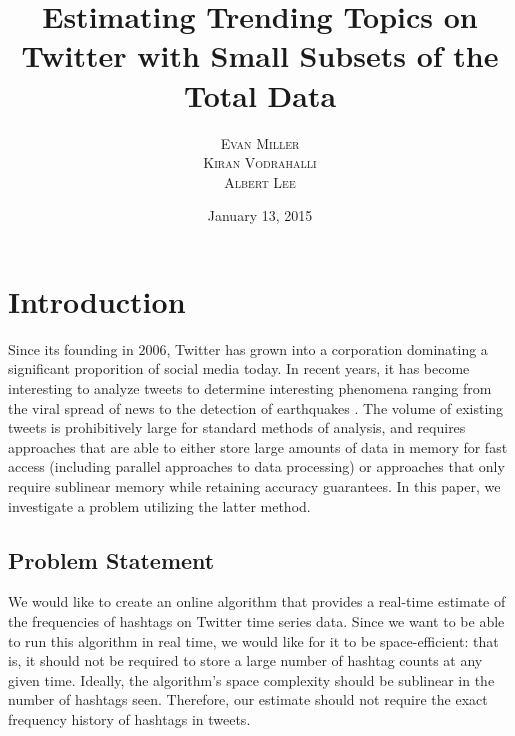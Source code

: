 \documentclass[twoside]{article}
\title{\vspace{-15mm}\fontsize{24pt}{10pt}\selectfont\textbf{Estimating Trending Topics on Twitter with Small Subsets of the Total Data}} %
\author{
\large
\textsc{Evan Miller}\\[2mm] 
\textsc{Kiran Vodrahalli}\\[2mm]
\textsc{Albert Lee}\\[2mm]
\vspace{-5mm}
}
\date{January 13, 2015}
\newcommand{\cc}[1]
 {\textbf{\cite{#1}}}
\begin{document}
\maketitle %


\begin{abstract}

\noindent \lipsum[1] %

\end{abstract}



\section{Introduction} \label{sec:Intro}

Since its founding in $2006$, Twitter has grown into a corporation dominating a significant
proporition of social media today. In recent years, it has become interesting to analyze tweets
to determine interesting phenomena ranging from the viral spread of news to the detection of earthquakes \cc{Burks:2014}. The volume of existing tweets is prohibitively large for standard methods of analysis, and requires approaches that are able to either store large amounts of data in memory for fast access (including parallel approaches to data processing) or approaches that only require sublinear memory while retaining accuracy guarantees. In this paper, we investigate a problem utilizing the latter method. 

\subsection{Problem Statement} 

We would like to create an online algorithm that provides a real-time estimate of the frequencies of hashtags on Twitter time series data.
Since we want to be able to run this algorithm in real time, we would like for it to be space-efficient: that is, it should not be required to store a large number of hashtag counts at any given time. Ideally, the algorithm's space complexity should be sublinear in the number of hashtags seen. 
Therefore, our estimate should not require the exact frequency history of hashtags in tweets. 
\end{document}
